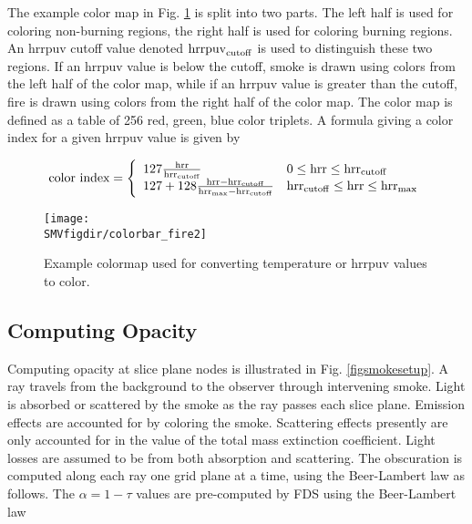 {The example color map in Fig.
\ref{fig:colormaps} is split into two parts.  The left half is used
for coloring non-burning regions, the right half is used for coloring burning regions.
An hrrpuv cutoff value denoted ${\rm hrrpuv}_{\rm cutoff}$ is used to
distinguish these two regions.
If an hrrpuv value is below the cutoff,
smoke is drawn using colors from the left half of the color map, while if an hrrpuv value is greater than the cutoff,
fire is drawn using colors from the right half of the color map.  The color map is defined as a table
of 256 red, green, blue color triplets.  A formula giving a color index for a given hrrpuv value is given by

\newcommand{\hrr}{{\rm hrr}}
\newcommand{\hrrcutoff}{{\rm hrr}_{\rm cutoff}}
\newcommand{\hrrmax}{{\rm hrr}_{\rm max}}

\begin{eqnarray}
\mbox{color index}=\left\{
\begin{array}{ll}
  127\frac{\hrr}{\hrrcutoff} & 0 \le \hrr \le \hrrcutoff \\
  127 + 128\frac{\hrr-\hrrcutoff}{\hrrmax-\hrrcutoff} & \hrrcutoff \le \hrr \le \hrrmax
\end{array}
\right.
\end{eqnarray}

\begin{figure}[bph]
\begin{center}
\texttt{[image: \\SMVfigdir/colorbar\_fire2]}
\end{center}
\caption[Example colormap used for converting temperature or hrrpuv values to color.]
{Example colormap used for converting temperature or hrrpuv values to color.}
\label{fig:colormaps}
\end{figure}


\subsection{Computing Opacity}
Computing opacity at slice plane nodes is illustrated in Fig.
\ref{figsmokesetup}. A ray travels from the background to the
observer through intervening smoke. Light is absorbed or scattered
by the smoke as the ray passes each slice plane. Emission effects
are accounted for by coloring the smoke.  Scattering effects
presently are only accounted for in the value of the total mass
extinction coefficient.  Light losses are assumed to be from both
absorption and scattering. The obscuration is computed along each
ray one grid plane at a time, using the Beer-Lambert law as
follows.  The $\alpha=1-\tau$ values are pre-computed by FDS using
the Beer-Lambert law~\cite{Siegel:2001}

}
